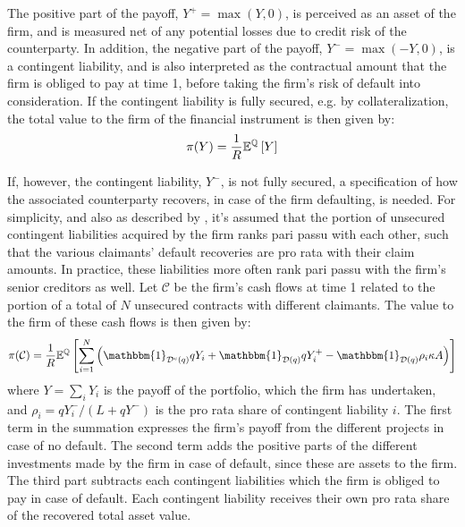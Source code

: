\documentclass[../main.tex]{subfiles}
\begin{document}
        The positive part of the payoff, $Y^{+}=\max\left(Y,0\right)$, is perceived as an asset of the firm, and is measured net of any potential losses due to credit risk of the counterparty.
        In addition, the negative part of the payoff, $Y^{-} = \max \left(-Y,0\right)$, is a contingent liability, and is also interpreted as the contractual amount that the firm is obliged to pay at time 1, before taking the firm's risk of default into consideration.
        If the contingent liability is fully secured, e.g. by collateralization, the total value to the firm of the financial instrument is then given by:
        \begin{equation}
            \pi(Y) = \frac{1}{R} \mathbb{E}^{\mathbb{Q}} \left[Y\right]
        \end{equation}

        If, however, the contingent liability, $Y^{-}$, is not fully secured, a specification of how the associated counterparty recovers, in case of the firm defaulting, is needed.
        For simplicity, and also as described by \textcite{ADS2019}, it's assumed that the portion of unsecured contingent liabilities acquired by the firm ranks pari passu with each other, such that the various claimants' default recoveries are pro rata with their claim amounts.
        In practice, these liabilities more often rank pari passu with the firm's senior creditors as well.
        Let $\mathcal{C}$ be the firm's cash flows at time 1 related to the portion of a total of $N$ unsecured contracts with different claimants. The value to the firm of these cash flows is then given by:
        \begin{equation} %
            \pi(\mathcal{C}) = \discountfactor \mathbb{E}^{\mathbb{Q}}\left[
            \sum_{i=1}^{N} \left(
                \mathbbm{1}_{\mathcal{D}^{c}(q)} qY_{i}
                + \mathbbm{1}_{\mathcal{D}(q)} qY_{i}^{+}
                - \mathbbm{1}_{\mathcal{D}(q)} \rho_{i} \kappa A
            \right)\right]
        \end{equation}
        where $Y = \sum_{i} Y_{i}$ is the payoff of the portfolio, which the firm has undertaken, and $\rho_{i} = qY_{i}^{-}/(L + qY^{-})$ is the pro rata share of contingent liability $i$. The first term in the summation expresses the firm's payoff from the different projects in case of no default. The second term adds the positive parts of the different investments made by the firm in case of default, since these are assets to the firm. The third part subtracts each contingent liabilities which the firm is obliged to pay in case of default. Each contingent liability receives their own pro rata share of the recovered total asset value.
\end{document}
